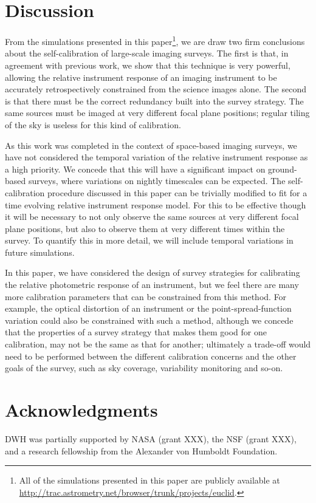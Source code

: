 \documentclass[manuscript]{aastex}
\begin{document}
\section{Discussion}
From the simulations presented in this paper\footnote{All of the simulations presented in this paper are publicly available at \url{http://trac.astrometry.net/browser/trunk/projects/euclid}.}, we are draw two firm conclusions about the self-calibration of large-scale imaging surveys. The first is that, in agreement with previous work, we show that this technique is very powerful, allowing the relative instrument response of an imaging instrument to be accurately retrospectively constrained from the science images alone. The second is that there must be the correct redundancy built into the survey strategy. The same sources must be imaged at very different focal plane positions; regular tiling of the sky is useless for this kind of calibration. 

As this work was completed in the context of space-based imaging surveys, we have not considered the temporal variation of the relative instrument response as a high priority. We concede that this will have a significant impact on ground-based surveys, where variations on nightly timescales can be expected. The self-calibration procedure discussed in this paper can be trivially modified to fit for a time evolving relative instrument response model. For this to be effective though it will be necessary to not only observe the same sources at very different focal plane positions, but also to observe them at very different times within the survey. To quantify this in more detail, we will include temporal variations in future simulations. 

In this paper, we have considered the design of survey strategies for calibrating the relative photometric response of an instrument, but we feel there are many more calibration parameters that can be constrained from this method. For example, the optical distortion of an instrument or the point-spread-function variation could also be constrained with such a method, although we concede that the properties of a survey strategy that makes them good for one calibration, may not be the same as that for another; ultimately a trade-off would need to be performed between the different calibration concerns and the other goals of the survey, such as sky coverage, variability monitoring and so-on. 

\acknowledgments
\section{Acknowledgments}
DWH was partially supported by NASA (grant XXX), the NSF (grant XXX), and a research fellowship from the Alexander von Humboldt Foundation.
\end{document}
